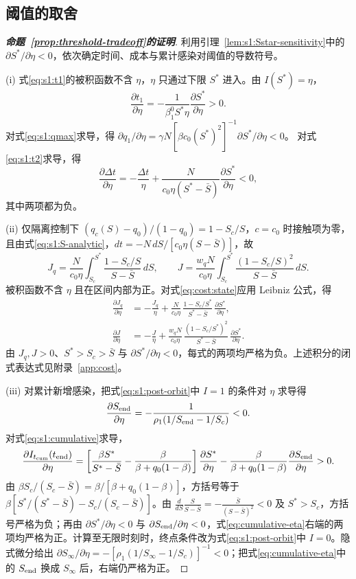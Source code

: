 \subsection{阈值的取舍}
\label{sec:proof:threshold-tradeoff}
\begin{proof}[\normalfont\bfseries 命题~\ref{prop:threshold-tradeoff}的证明]
利用引理~\ref{lem:s1:Sstar-sensitivity}中的 $\partial S^*/\partial\eta<0$，依次确定时间、成本与累计感染对阈值的导数符号。

(i) 式\eqref{eq:s1:t1}的被积函数不含 $\eta$，$\eta$ 只通过下限 $S^*$ 进入。由 $I(S^*)=\eta$，
\[
\frac{\partial t_1}{\partial\eta}
=-\frac1{\beta_1^0 S^*\eta}\frac{\partial S^*}{\partial\eta}>0.
\]
对式\eqref{eq:s1:qmax}求导，得
$\partial q_1/\partial\eta=\gamma N[\beta c_0(S^*)^2]^{-1}\partial S^*/\partial\eta<0$。
对式\eqref{eq:s1:t2}求导，得
\[
\frac{\partial\Delta t}{\partial\eta}
=-\frac{\Delta t}{\eta}
+\frac{N}{c_0\eta(S^*-\bar S)}\frac{\partial S^*}{\partial\eta}<0,
\]
其中两项都为负。

(ii) 仅隔离控制下 $(q_c(S)-q_0)/(1-q_0)=1-S_c/S$，$c=c_0$ 时接触项为零，且由式\eqref{eq:s1:S-analytic}，$dt=-N\,dS/[c_0\eta(S-\bar S)]$，故
\begin{equation}
J_q=\frac{N}{c_0\eta}\int_{S_c}^{S^*}\frac{1-S_c/S}{S-\bar S}\,dS,
\qquad
J=\frac{w_qN}{c_0\eta}\int_{S_c}^{S^*}\frac{(1-S_c/S)^2}{S-\bar S}\,dS.
\label{eq:cost:state}
\end{equation}
被积函数不含 $\eta$ 且在区间内部为正。对式\eqref{eq:cost:state}应用 Leibniz 公式，得
\begin{align*}
\frac{\partial J_q}{\partial\eta}
&=-\frac{J_q}{\eta}
+\frac{N}{c_0\eta}\,\frac{1-S_c/S^*}{S^*-\bar S}\,\frac{\partial S^*}{\partial\eta},\\
\frac{\partial J}{\partial\eta}
&=-\frac{J}{\eta}
+\frac{w_qN}{c_0\eta}\,\frac{(1-S_c/S^*)^2}{S^*-\bar S}\,\frac{\partial S^*}{\partial\eta}.
\end{align*}
由 $J_q,J>0$、$S^*>S_c>\bar S$ 与 $\partial S^*/\partial\eta<0$，每式的两项均严格为负。上述积分的闭式表达式见附录~\ref{app:cost}。

(iii) 对累计新增感染，把式\eqref{eq:s1:post-orbit}中 $I=1$ 的条件对 $\eta$ 求导得
\[
\frac{\partial S_{\rm end}}{\partial\eta}
=-\frac1{\rho_1(1/S_{\rm end}-1/S_c)}<0.
\]
对式\eqref{eq:s1:cumulative}求导，
\begin{equation}
\frac{\partial I_{t_{\mathrm{cum}}}(t_{\rm end})}{\partial\eta}
=\left[\frac{\beta S^*}{S^*-\bar S}-\frac{\beta}{\beta+q_0(1-\beta)}\right]\frac{\partial S^*}{\partial\eta}
-\frac{\beta}{\beta+q_0(1-\beta)}\frac{\partial S_{\rm end}}{\partial\eta}>0.
\label{eq:cumulative-eta}
\end{equation}
由 $\beta S_c/(S_c-\bar S)=\beta/[\beta+q_0(1-\beta)]$，方括号等于 $\beta[S^*/(S^*-\bar S)-S_c/(S_c-\bar S)]$。由 $\frac{d}{dS}\frac{S}{S-\bar S}=-\frac{\bar S}{(S-\bar S)^2}<0$ 及 $S^*>S_c$，方括号严格为负；再由 $\partial S^*/\partial\eta<0$ 与 $\partial S_{\rm end}/\partial\eta<0$，式\eqref{eq:cumulative-eta}右端的两项均严格为正。计算至无限时刻时，终点条件改为式\eqref{eq:s1:post-orbit}中 $I=0$。隐式微分给出 $\partial S_\infty/\partial\eta=-[\rho_1(1/S_\infty-1/S_c)]^{-1}<0$；把式\eqref{eq:cumulative-eta}中的 $S_{\rm end}$ 换成 $S_\infty$ 后，右端仍严格为正。
\end{proof}

